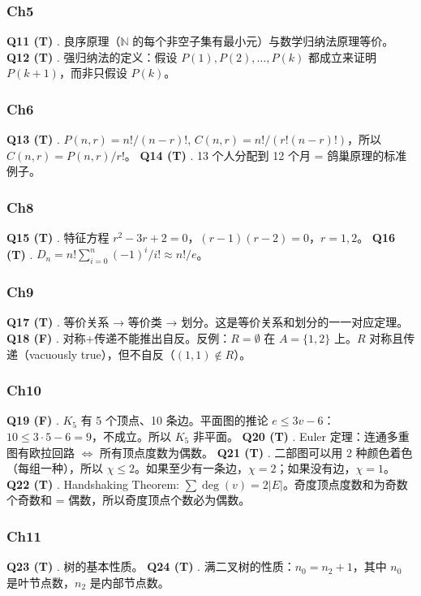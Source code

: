 \documentclass[10pt,a4paper,openany]{ctexbook}
\theoremstyle{definition}
\theoremstyle{remark}
\begin{document}
\subsubsection{Ch5}

\textbf{Q11 (T)} . 良序原理（$\mathbb{N}$ 的每个非空子集有最小元）与数学归纳法原理等价。
\textbf{Q12 (T)} . 强归纳法的定义：假设 $P(1), P(2), \dots, P(k)$ 都成立来证明 $P(k+1)$，而非只假设 $P(k)$。
\subsubsection{Ch6}

\textbf{Q13 (T)} . $P(n,r) = n!/(n-r)!$, $C(n,r) = n!/(r!(n-r)!)$，所以 $C(n,r) = P(n,r)/r!$。
\textbf{Q14 (T)} . 13 个人分配到 12 个月 = 鸽巢原理的标准例子。
\subsubsection{Ch8}

\textbf{Q15 (T)} . 特征方程 $r^2 - 3r + 2 = 0$，$(r-1)(r-2) = 0$，$r = 1, 2$。
\textbf{Q16 (T)} . $D_n = n! \sum_{i=0}^{n} (-1)^i / i! \approx n!/e$。
\subsubsection{Ch9}

\textbf{Q17 (T)} . 等价关系 → 等价类 → 划分。这是等价关系和划分的一一对应定理。
\textbf{Q18 (F)} . 对称+传递不能推出自反。反例：$R = \emptyset$ 在 $A = \{1,2\}$ 上。$R$ 对称且传递（vacuously true），但不自反（$(1,1) \notin R$）。
\subsubsection{Ch10}

\textbf{Q19 (F)} . $K_5$ 有 5 个顶点、10 条边。平面图的推论 $e \le 3v - 6$：$10 \le 3 \cdot 5 - 6 = 9$，不成立。所以 $K_5$ 非平面。
\textbf{Q20 (T)} . Euler 定理：连通多重图有欧拉回路 $\iff$ 所有顶点度数为偶数。
\textbf{Q21 (T)} . 二部图可以用 2 种颜色着色（每组一种），所以 $\chi \le 2$。如果至少有一条边，$\chi = 2$；如果没有边，$\chi = 1$。
\textbf{Q22 (T)} . Handshaking Theorem: $\sum \deg(v) = 2|E|$。奇度顶点度数和为奇数个奇数和 = 偶数，所以奇度顶点个数必为偶数。
\subsubsection{Ch11}

\textbf{Q23 (T)} . 树的基本性质。
\textbf{Q24 (T)} . 满二叉树的性质：$n_0 = n_2 + 1$，其中 $n_0$ 是叶节点数，$n_2$ 是内部节点数。
\end{document}
